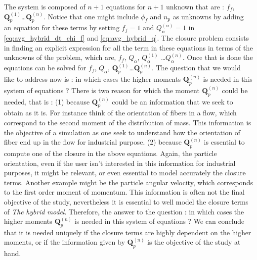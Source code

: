 The system is composed of $n+1$ equations for $n+1$ unknown that are : $f_f$, $\textbf{Q}_p^{(1)}$\ldots$\textbf{Q}_p^{(n)}$. 
Notice that one might include $\phi_f$ and $n_p$ as unknowns by adding an equation for these terms by setting $f_f=1$ and $Q_\alpha^{(n)} =1$ in \ref{eq:avg_hybrid_dt_chi_f} and \ref{eq:avg_hybrid_q}.
The closure problem consists in finding an explicit expression for all the term in these equations in terms of the unknowns of the problem, which are, 
$f_f$, $Q_\alpha$, $Q_\alpha^{(1)}$ \ldots $Q_\alpha^{(n)}$.  
Once that is done the equations can be solved for $f_f$,  $Q_\alpha$, $\textbf{Q}_p^{(1)}$\ldots$\textbf{Q}_p^{(n)}$. 
The question that we would like to address now is : in which cases the higher moments $\textbf{Q}_p^{(n)}$ is needed in this system of equations ?
There is two reason for which the moment $\textbf{Q}_p^{(n)}$ could be needed, that is : 
(1) because $\textbf{Q}_p^{(n)}$ could be an information that we seek to obtain as it is.
For instance think of the orientation of fibers in a flow, which correspond to the second moment of the distribution of mass.  
This information is the objective of a simulation as one seek to understand how the orientation of fiber end up in the flow for industrial purpose. 
(2) because $\textbf{Q}_p^{(n)}$ is essential to compute one of the closure in the above equations. 
Again, the particle orientation, even if the user isn't interested in this information for industrial purposes, it might be relevant, or even essential to model accurately the closure terms. 
Another example might be the particle angular velocity, which corresponds to the first order moment of momentum. 
This information is often not the final objective of the study, nevertheless it is essential to well model the closure terms of \textit{The hybrid model}. 
Therefore, the answer to the question : in which cases the higher moments $\textbf{Q}_p^{(n)}$ is needed in this system of equations ?
We can conclude that it is needed uniquely if the closure terms are highly dependent on the higher moments, or if the information given by $\textbf{Q}_p^{(n)}$ is the objective of the study at hand. 

